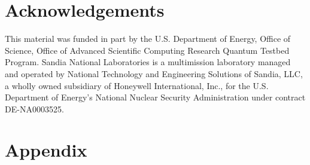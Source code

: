 \documentclass[aps,nofootinbib,pra,notitlepage,twocolumn]{revtex4-1}
\begin{document}
\section{Acknowledgements}
\label{sec:acknowledgements}
This material was funded in part by the U.S. Department of Energy, Office of Science, Office of Advanced Scientific Computing Research Quantum Testbed Program. Sandia National Laboratories is a multimission laboratory managed and operated by National Technology and Engineering Solutions of Sandia, LLC, a wholly owned subsidiary of Honeywell International, Inc., for the U.S. Department of Energy's National Nuclear Security Administration under contract DE-NA0003525.



\newpage
\section{Appendix}
\label{sec:appendix}

\end{document}
